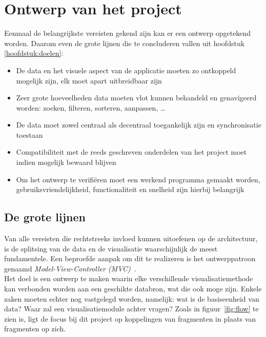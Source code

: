 \chapter{Ontwerp van het project}
\label{hoofdstuk:ontwerp}

Eenmaal de belangrijkste vereisten gekend zijn kan er een ontwerp opgetekend worden. Daarom even de grote lijnen die te concluderen vallen uit hoofdstuk \ref{hoofdstuk:doelen}:

\begin{itemize}
  \item De data en het visuele aspect van de applicatie moeten zo ontkoppeld mogelijk zijn, elk moet apart uitbreidbaar zijn
  \item Zeer grote hoeveelheden data moeten vlot kunnen behandeld en genavigeerd worden: zoeken, filteren, sorteren, aanpassen, \ldots
  \item De data moet zowel centraal als decentraal toegankelijk zijn en synchronisatie toestaan
  \item Compatibiliteit met de reeds geschreven onderdelen van het project moet indien mogelijk bewaard blijven
  \item Om het ontwerp te verifi\"eren moet een werkend programma gemaakt worden, gebruiksvriendelijkheid, functionaliteit en snelheid zijn hierbij belangrijk
\end{itemize}

\section{De grote lijnen}
Van alle vereisten die rechtstreeks invloed kunnen uitoefenen op de architectuur, is de splitsing van de data en de visualisatie waarschijnlijk de meest fundamentele. Een beproefde aanpak om dit te realizeren is het ontwerppatroon genaamd \emph{Model-View-Controller (MVC)}~\cite{wiki:mvc}.\\

Het doel is een ontwerp te maken waarin elke verschillende visualisatiemethode kan verbonden worden aan een geschikte databron, wat die ook moge zijn. Enkele zaken moeten echter nog vastgelegd worden, namelijk: wat is de basiseenheid van data? Waar zal een visualisatiemodule achter vragen? Zoals in figuur~\ref{fig:flow} te zien is, ligt de focus bij dit project op koppelingen van fragmenten in plaats van fragmenten op zich.\\

